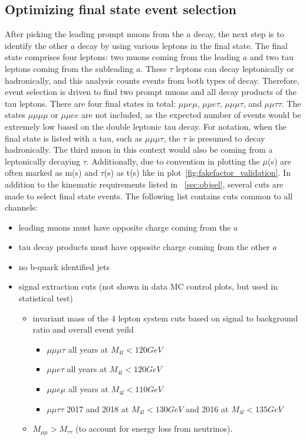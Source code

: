 \subsection{Optimizing final state event selection}
After picking the leading prompt muons from the $a$ decay, the next step is to identify the other $a$ decay by using various leptons in the final state. The final state comprises four leptons: two muons coming from the leading $a$ and two tau leptons coming from the subleading $a$. These $\tau$ leptons can decay leptonically or hadronically, and this analysis counts events from both types of decay. Therefore, event selection is driven to find two prompt muons and all decay products of the tau leptons. There are four final states in total: $\mu\mu e \mu$, $\mu\mu e \tau$, $\mu\mu\mu\tau$, and $\mu\mu\tau\tau$. 
The states $\mu\mu\mu\mu$ or $\mu\mu e e $ are not included, as the expected number of events would be extremely low based on the double leptonic tau decay. 
For notation, when the final state is listed with a tau, such as $\mu\mu\mu\tau$, the $\tau$ is presumed to decay hadronically. The third muon in this context would also be coming from a leptonically decaying $\tau$. Additionally, due to convention in plotting the $\mu$(s) are often marked as m(s) and $\tau$(s) as t(s) like in plot~\ref{fig:fakefactor_validation}.
In addition to the kinematic requirements listed in ~\ref{sec:objsel}, several cuts are made to select final state events. The following list contains cuts common to all channels:
\begin{itemize}
    \item leading muons must have opposite charge coming from the $a$
    \item tau decay products must have opposite charge coming from the other $a$
    \item no b-quark identified jets 
    \item signal extraction cuts (not shown in data MC control plots, but used in statistical test)
    \begin{itemize}
    \item invariant mass of the 4 lepton system cuts based on signal to background ratio and overall event yeild
    \begin{itemize}
        \item $\mu\mu\mu\tau$ all years at $M_{4l}<120GeV$
        \item $\mu\mu e \tau$ all years at $M_{4l}<120GeV$
        \item $\mu\mu e \mu$ all years at $M_{4l}<110GeV$
        \item $\mu\mu\tau\tau$ 2017 and 2018 at $M_{4l}<130GeV$ and 2016 at $M_{4l}<135GeV$
    \end{itemize}
    \item $M_{\mu\mu} > M_{\tau\tau}$ (to account for energy loss from neutrinos).
    \end{itemize}
\end{itemize}

